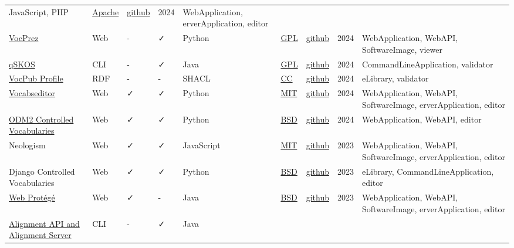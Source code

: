 \documentclass[
  DIV=10]{article}
\begin{document}
\begin{longtable}[]{@{}lllllllll@{}}
JavaScript, PHP & \href{https://spdx.org/licenses/Apache-2.0}{Apache} &
\href{https://github.com/NCOR-BR/onto4all}{github} & 2024 &
WebApplication, erverApplication, editor \\
\href{https://github.com/RDFLib/VocPrez}{VocPrez} & Web & - & ✓ & Python
& \href{https://spdx.org/licenses/GPL-3.0-or-later}{GPL} &
\href{https://github.com/RDFLib/VocPrez}{github} & 2024 &
WebApplication, WebAPI, SoftwareImage, viewer \\
\href{https://github.com/cmader/qSKOS/}{qSKOS} & CLI & - & ✓ & Java &
\href{https://spdx.org/licenses/GPL-3.0-or-later}{GPL} &
\href{https://github.com/cmader/qSKOS/}{github} & 2024 &
CommandLineApplication, validator \\
\href{https://surroundaustralia.github.io/vocpub-profile/profile.html}{VocPub
Profile} & RDF & - & - & SHACL &
\href{https://spdx.org/licenses/CC-BY-4.0}{CC} &
\href{https://github.com/AGLDWG/vocpub-profile/}{github} & 2024 &
eLibrary, validator \\
\href{https://vocabseditor.acdh.oeaw.ac.at/}{Vocabseditor} & Web & ✓ & ✓
& Python & \href{https://spdx.org/licenses/MIT}{MIT} &
\href{https://github.com/acdh-oeaw/vocabseditor}{github} & 2024 &
WebApplication, WebAPI, SoftwareImage, erverApplication, editor \\
\href{http://vocabulary.odm2.org/}{ODM2 Controlled Vocabularies} & Web &
✓ & ✓ & Python & \href{https://spdx.org/licenses/BSD-3-Clause}{BSD} &
\href{https://github.com/ODM2/ODM2ControlledVocabularies}{github} & 2024
& WebApplication, WebAPI, editor \\
Neologism & Web & ✓ & ✓ & JavaScript &
\href{https://spdx.org/licenses/MIT}{MIT} &
\href{https://github.com/Semantic-Society/Neologism}{github} & 2023 &
WebApplication, WebAPI, SoftwareImage, erverApplication, editor \\
Django Controlled Vocabularies & Web & ✓ & ✓ & Python &
\href{https://spdx.org/licenses/BSD-3-Clause}{BSD} &
\href{https://github.com/unt-libraries/django-controlled-vocabularies}{github}
& 2023 & eLibrary, CommandLineApplication, editor \\
\href{https://protegewiki.stanford.edu/wiki/WebProtege}{Web Protégé} &
Web & ✓ & - & Java & \href{https://spdx.org/licenses/BSD-3-Clause}{BSD}
& \href{https://github.com/protegeproject/webprotege}{github} & 2023 &
WebApplication, WebAPI, SoftwareImage, erverApplication, editor \\
\href{https://moex.gitlabpages.inria.fr/alignapi/}{Alignment API and
Alignment Server} & CLI & - & ✓ & Java &

\end{longtable}
\end{document}
